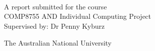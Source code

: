 \begin{titlepage}
  \enlargethispage{2cm}
  \begin{center}
    \makeatletter
    \Huge\textbf{\@title} \\[.4cm]
    \Huge\textbf{\thesisqualifier} \\[2.5cm]
    \huge\textbf{\@author} \\[9cm]
    \makeatother
    \LARGE A report submitted for the course \\
    COMP8755 AND Individual Computing Project \\
    Supervised by: Dr Penny Kyburz
    
    The Australian National University \\[2cm]
    \thismonth

    \vspace*{\fill}
    \makeatletter
        {\selectfont\textcopyright}\ \@author{} \number\year
        \makeatother
    
  \end{center}
\end{titlepage}
